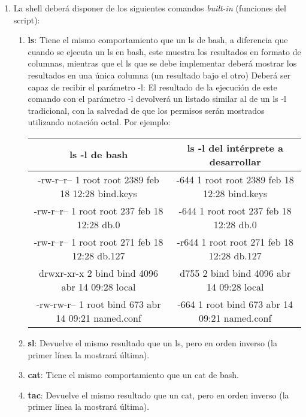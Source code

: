 \begin{enumerate}
\begin{enumerate}
	    \item La shell deberá disponer de los siguientes comandos \textit{built-in} (funciones del script):
	    \begin{enumerate}
	     \item \textbf{ls}: Tiene el mismo comportamiento que un ls de bash, a diferencia que cuando se ejecuta un ls en bash, este muestra los resultados en formato de columnas, mientras que el ls que se debe implementar deberá mostrar los resultados en una única columna (un resultado bajo el otro) Deberá ser capaz de recibir el parámetro -l: El resultado de la ejecución de este comando con el parámetro -l devolverá un listado similar al de un ls -l tradicional, con la salvedad de que los permisos serán mostrados utilizando notación octal. Por ejemplo:
	     \begin{table}[th]
		    \centering
		    \begin{tabular}{| c | c |}
			    \hline
			    \bf ls -l de bash & \bf ls -l del intérprete a desarrollar \\
			    \hline
			    -rw-r--r-- 1 root root 2389 feb 18 12:28 bind.keys & -644 1 root root 2389 feb 18 12:28 bind.keys \\ 
			    \hline
			    -rw-r--r-- 1 root root 237 feb 18 12:28 db.0 & -644 1 root root 237 feb 18 12:28 db.0 \\
			    \hline
			    -rw-r--r-- 1 root root 271 feb 18 12:28 db.127 & -r644 1 root root 271 feb 18 12:28 db.127 \\
			    \hline
			    drwxr-xr-x 2 bind bind 4096 abr 14 09:28 local & d755 2 bind bind 4096 abr 14 09:28 local \\
			    \hline
			    -rw-rw-r-- 1 root bind 673 abr 14 09:21 named.conf & -664 1 root bind 673 abr 14 09:21 named.conf \\
			    \hline
		    \end{tabular}
	     \end{table}
	     
	     \item \textbf{sl}: Devuelve el mismo resultado que un ls, pero en orden inverso (la primer línea la mostrará última).

	     \item \textbf{cat}: Tiene el mismo comportamiento que un cat de bash.

	     \item \textbf{tac}: Devuelve el mismo resultado que un cat, pero en orden inverso (la primer línea la mostrará última).


\end{enumerate}
\end{enumerate}
\end{enumerate}
